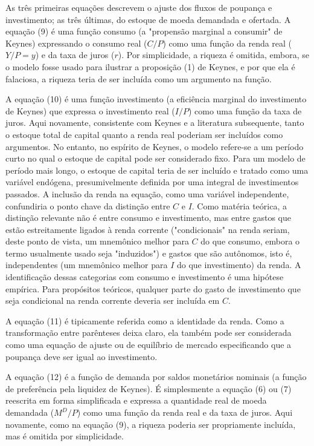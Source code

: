 \documentclass[12pt]{article}
\begin{document}
As três primeiras equações descrevem o ajuste dos fluxos de poupança e investimento; as três últimas, do estoque de moeda demandada e ofertada. A equação (9) é uma função consumo (a "propensão marginal a consumir" de Keynes) expressando o consumo real ($C/P$) como uma função da renda real ($Y/P = y$) e da taxa de juros ($r$). Por simplicidade, a riqueza é omitida, embora, se o modelo fosse usado para ilustrar a proposição (1) de Keynes, e por que ela é falaciosa, a riqueza teria de ser incluída como um argumento na função.

A equação (10) é uma função investimento (a eficiência marginal do investimento de Keynes) que expressa o investimento real ($I/P$) como uma função da taxa de juros. Aqui novamente, consistente com Keynes e a literatura subsequente, tanto o estoque total de capital quanto a renda real poderiam ser incluídos como argumentos. No entanto, no espírito de Keynes, o modelo refere-se a um período curto no qual o estoque de capital pode ser considerado fixo. Para um modelo de período mais longo, o estoque de capital teria de ser incluído e tratado como uma variável endógena, presumivelmente definida por uma integral de investimentos passados. A inclusão da renda na equação, como uma variável independente, confundiria o ponto chave da distinção entre $C$ e $I$. Como matéria teórica, a distinção relevante não é entre consumo e investimento, mas entre gastos que estão estreitamente ligados à renda corrente ("condicionais" na renda seriam, deste ponto de vista, um mnemônico melhor para $C$ do que consumo, embora o termo usualmente usado seja "induzidos") e gastos que são autônomos, isto é, independentes (um mnemônico melhor para $I$ do que investimento) da renda. A identificação dessas categorias com consumo e investimento é uma hipótese empírica. Para propósitos teóricos, qualquer parte do gasto de investimento que seja condicional na renda corrente deveria ser incluída em $C$.

A equação (11) é tipicamente referida como a identidade da renda. Como a transformação entre parênteses deixa claro, ela também pode ser considerada como uma equação de ajuste ou de equilíbrio de mercado especificando que a poupança deve ser igual ao investimento.

A equação (12) é a função de demanda por saldos monetários nominais (a função de preferência pela liquidez de Keynes). É simplesmente a equação (6) ou (7) reescrita em forma simplificada e expressa a quantidade real de moeda demandada ($M^D/P$) como uma função da renda real e da taxa de juros. Aqui novamente, como na equação (9), a riqueza poderia ser propriamente incluída, mas é omitida por simplicidade.
\end{document}
